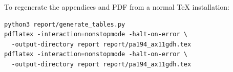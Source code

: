 \documentclass[11pt,a4paper]{article}
\begin{document}
To regenerate the appendices and PDF from a normal TeX installation:
\begin{verbatim}
python3 report/generate_tables.py
pdflatex -interaction=nonstopmode -halt-on-error \
  -output-directory report report/pa194_ax11gdh.tex
pdflatex -interaction=nonstopmode -halt-on-error \
  -output-directory report report/pa194_ax11gdh.tex
\end{verbatim}
\appendix

\end{document}
